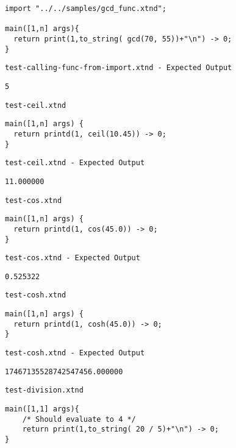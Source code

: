 \begin{lstlisting}
import "../../samples/gcd_func.xtnd";

main([1,n] args){
  return print(1,to_string( gcd(70, 55))+"\n") -> 0;
}
\end{lstlisting}


\medskip \noindent \texttt{test-calling-func-from-import.xtnd - Expected Output}


\begin{lstlisting}
5
\end{lstlisting}


\medskip \noindent \texttt{test-ceil.xtnd}


\begin{lstlisting}
main([1,n] args) {
  return printd(1, ceil(10.45)) -> 0;
}
\end{lstlisting}


\medskip \noindent \texttt{test-ceil.xtnd - Expected Output}


\begin{lstlisting}
11.000000
\end{lstlisting}


\medskip \noindent \texttt{test-cos.xtnd}


\begin{lstlisting}
main([1,n] args) {
  return printd(1, cos(45.0)) -> 0;
}
\end{lstlisting}


\medskip \noindent \texttt{test-cos.xtnd - Expected Output}


\begin{lstlisting}
0.525322
\end{lstlisting}


\medskip \noindent \texttt{test-cosh.xtnd}


\begin{lstlisting}
main([1,n] args) {
  return printd(1, cosh(45.0)) -> 0;
}
\end{lstlisting}


\medskip \noindent \texttt{test-cosh.xtnd - Expected Output}


\begin{lstlisting}
17467135528742547456.000000
\end{lstlisting}


\medskip \noindent \texttt{test-division.xtnd}


\begin{lstlisting}
main([1,1] args){
	/* Should evaluate to 4 */
	return print(1,to_string( 20 / 5)+"\n") -> 0;
}
\end{lstlisting}


